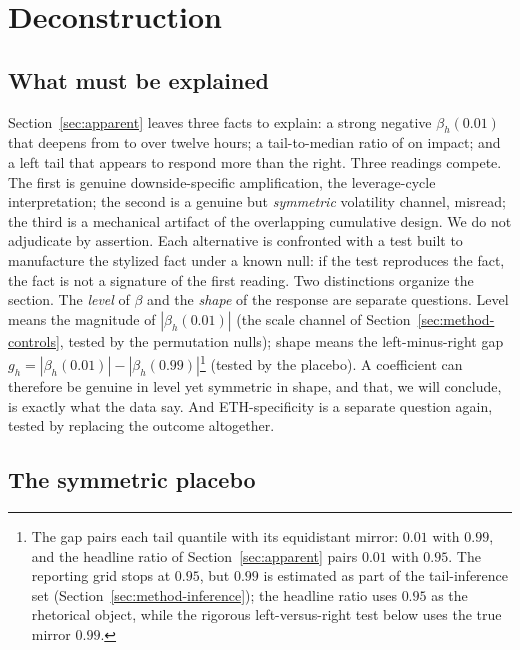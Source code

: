 \section{Deconstruction}
\label{sec:deconstruction}

\subsection{What must be explained}

Section~\ref{sec:apparent} leaves three facts to explain: a strong negative
$\beta_h(0.01)$ that deepens from \BetaQoneHzero{} to \BetaQoneHtwelve{}
over twelve hours; a tail-to-median ratio of \RatioTailMedImpact{} on
impact; and a left tail that appears to respond more than the right. Three
readings compete. The first is genuine downside-specific amplification, the
leverage-cycle interpretation; the second is a genuine but \emph{symmetric}
volatility channel, misread; the third is a mechanical artifact of the overlapping
cumulative design. We do not adjudicate by assertion. Each alternative is
confronted with a test built to manufacture the stylized fact under
a known null: if the test reproduces the fact, the fact is not a signature
of the first reading. Two distinctions organize the section. The \emph{level} of $\beta$
and the \emph{shape} of the response are separate questions. Level
means the magnitude of $|\beta_h(0.01)|$ (the scale channel of
Section~\ref{sec:method-controls}, tested by the permutation nulls); shape
means the left-minus-right gap $g_h = |\beta_h(0.01)| -
|\beta_h(0.99)|$\footnote{The gap pairs each tail quantile with its
equidistant mirror: $0.01$ with $0.99$, and the headline ratio of
Section~\ref{sec:apparent} pairs $0.01$ with $0.95$. The reporting grid
stops at $0.95$, but $0.99$ is estimated as part of the tail-inference set
(Section~\ref{sec:method-inference}); the headline ratio uses $0.95$ as the
rhetorical object, while the rigorous left-versus-right test below uses the
true mirror $0.99$.} (tested by the placebo). A coefficient can
therefore be genuine in level yet symmetric in shape, and that, we will conclude, is
exactly what the data say. And ETH-specificity is a separate question again, tested by
replacing the outcome altogether.

\subsection{The symmetric placebo}
\label{sec:placebo}

